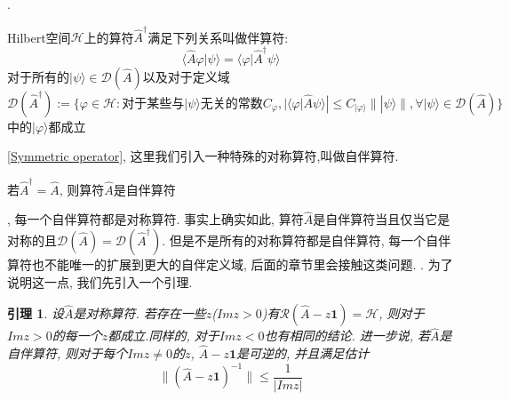 \documentclass[a4paper,11pt]{article}
\theoremstyle{mystyle}
\newtheorem{lemma}{\hspace{2em}引理}[section]
\begin{document}
.
\begin{definition}[伴算符]\label{Self-adjoint def 2}
  Hilbert空间$\mathcal{H}$上的算符$\hat{A}^{\dag}$满足下列关系叫做伴算符:
\begin{equation}\label{Adjoint operator}
  \langle\hat{A}\varphi|\psi\rangle=\langle\varphi|\hat{A}^{\dag}\psi\rangle
\end{equation}
对于所有的$|\psi\rangle\in\mathcal{D}(\hat{A})$以及对于定义域
\begin{equation*}
  \mathcal{D}(\hat{A}^{\dag}):=\{\varphi\in\mathcal{H}:\text{对于某些与$|\psi\rangle$无关的常数}C_{\varphi}, |\langle\varphi|\hat{A}\psi\rangle|\leq C_{|\varphi\rangle}\||\psi\rangle\|,\forall|\psi\rangle\in\mathcal{D}(\hat{A})\}
\end{equation*}
中的$|\varphi\rangle$都成立
\end{definition}
\ref{Symmetric operator}, 这里我们引入一种特殊的对称算符,叫做自伴算符.
\begin{definition}
  若$\hat{A}^{\dag}=\hat{A}$, 则算符$\hat{A}$是自伴算符
\end{definition}
, 每一个自伴算符都是对称算符. 事实上确实如此, 算符$\hat{A}$是自伴算符当且仅当它是对称的且$\mathcal{D}(\hat{A})=\mathcal{D}(\hat{A}^{\dag})$. 但是不是所有的对称算符都是自伴算符, 每一个自伴算符也不能唯一的扩展到更大的自伴定义域, 后面的章节里会接触这类问题.
. 为了说明这一点, 我们先引入一个引理.
\begin{lemma}\label{sym operator lemma}
  设$\hat{A}$是对称算符. 若存在一些$z$($Im z>0$)有$\mathcal{R}(\hat{A}-z\mathbf{1})=\mathcal{H}$, 则对于$Im z>0$的每一个$z$都成立.同样的, 对于$Im z<0$也有相同的结论. 进一步说, 若$\hat{A}$是自伴算符, 则对于每个$Im z\neq0$的$z$, $\hat{A}-z\mathbf{1}$是可逆的, 并且满足估计
\begin{equation}\label{sym estimate}
  \|(\hat{A}-z\mathbf{1})^{-1}\|\leq\frac{1}{|Im z|}
\end{equation}
\end{lemma}
\end{document}
